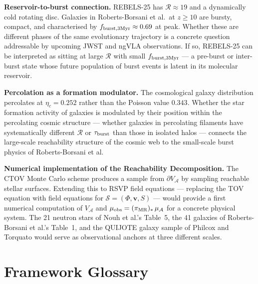 \documentclass[12pt, oneside]{article}
\begin{document}
\textbf{Reservoir-to-burst connection.} REBELS-25 has $\mathcal{R} \approx 19$ and a dynamically cold rotating disc. Galaxies in Roberts-Borsani et al.\ at $z \geq 10$ are bursty, compact, and characterised by $f_{\rm burst,3Myr} \approx 0.69$ at peak. Whether these are different phases of the same evolutionary trajectory is a concrete question addressable by upcoming JWST and ngVLA observations. If so, REBELS-25 can be interpreted as sitting at large $\mathcal{R}$ with small $f_{\rm burst,3Myr}$ --- a pre-burst or inter-burst state whose future population of burst events is latent in its molecular reservoir.

\textbf{Percolation as a formation modulator.} The cosmological galaxy distribution percolates at $\eta_c = 0.252$ rather than the Poisson value $0.343$. Whether the star formation activity of galaxies is modulated by their position within the percolating cosmic structure --- whether galaxies in percolating filaments have systematically different $\mathcal{R}$ or $\tau_{\rm burst}$ than those in isolated halos --- connects the large-scale reachability structure of the cosmic web to the small-scale burst physics of Roberts-Borsani et al.

\textbf{Numerical implementation of the Reachability Decomposition.} The CTOV Monte Carlo scheme produces a sample from $\partial V_{\mathcal{A}}$ by sampling reachable stellar surfaces. Extending this to RSVP field equations --- replacing the TOV equation with field equations for $\mathcal{S} = (\Phi, \mathbf{v}, S)$ --- would provide a first numerical computation of $V_{\mathcal{A}}$ and $\mu_{\rm obs} = (\pi_{\rm MR})_*\,\mu_{\mathcal{A}}$ for a concrete physical system. The 21 neutron stars of Nouh et al.'s Table~5, the 41 galaxies of Roberts-Borsani et al.'s Table~1, and the QUIJOTE galaxy sample of Philcox and Torquato would serve as observational anchors at three different scales.

\section{Framework Glossary}
\end{document}
